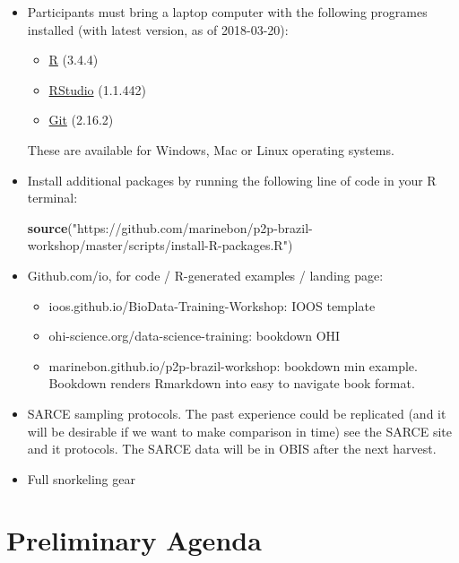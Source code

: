 \documentclass[]{book}
\newenvironment{Shaded}{\begin{snugshade}}{\end{snugshade}}
\newcommand{\KeywordTok}[1]{\textcolor[rgb]{0.13,0.29,0.53}{\textbf{#1}}}
\newcommand{\NormalTok}[1]{#1}
\newcommand{\StringTok}[1]{\textcolor[rgb]{0.31,0.60,0.02}{#1}}
\providecommand{\tightlist}{%
  \setlength{\itemsep}{0pt}\setlength{\parskip}{0pt}}
\theoremstyle{definition}
\theoremstyle{definition}
\theoremstyle{definition}
\theoremstyle{remark}
\begin{document}
\begin{itemize}
\item
  Participants must bring a laptop computer with the following programes
  installed (with latest version, as of 2018-03-20):

  \begin{itemize}
  \tightlist
  \item
    \href{https://cran.r-project.org}{R} (3.4.4)
  \item
    \href{https://www.rstudio.com/products/rstudio/download/\#download}{RStudio}
    (1.1.442)
  \item
    \href{https://git-scm.com/downloads}{Git} (2.16.2)
  \end{itemize}

  These are available for Windows, Mac or Linux operating systems.
\item
  Install additional packages by running the following line of code in
  your R terminal:

\begin{Shaded}
\begin{Highlighting}[]
\KeywordTok{source}\NormalTok{(}\StringTok{"https://github.com/marinebon/p2p-brazil-workshop/master/scripts/install-R-packages.R"}\NormalTok{)}
\end{Highlighting}
\end{Shaded}
\item
  Github.com/io, for code / R-generated examples / landing page:

  \begin{itemize}
  \tightlist
  \item
    ioos.github.io/BioData-Training-Workshop: IOOS template
  \item
    ohi-science.org/data-science-training: bookdown OHI
  \item
    marinebon.github.io/p2p-brazil-workshop: bookdown min example.
    Bookdown renders Rmarkdown into easy to navigate book format.
  \end{itemize}
\item
  SARCE sampling protocols. The past experience could be replicated (and
  it will be desirable if we want to make comparison in time) see the
  SARCE site and it protocols. The SARCE data will be in OBIS after the
  next harvest.
\item
  Full snorkeling gear
\end{itemize}

\hypertarget{preliminary-agenda}{%
\section{Preliminary Agenda}\label{preliminary-agenda}}
\end{document}
